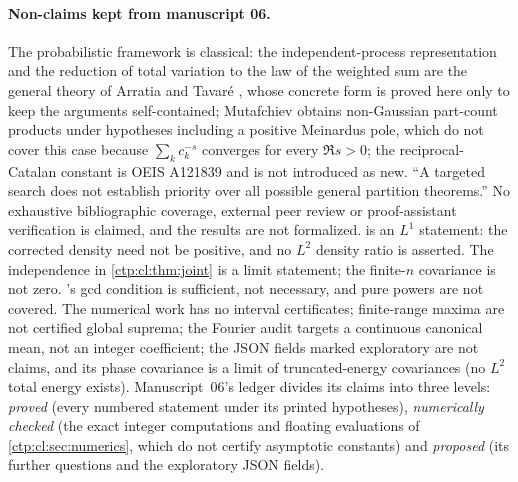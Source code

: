 \documentclass[11pt,a4paper]{article}
\numberwithin{equation}{section}
\theoremstyle{definition}
\theoremstyle{remark}
\begin{document}
\paragraph{Non-claims kept from manuscript 06.} The probabilistic
framework is classical: the independent-process representation and the
reduction of total variation to the law of the weighted sum are the
general theory of Arratia and Tavar\'e \cite[Theorem~3]{arratia}, whose
concrete form is proved here only to keep the arguments self-contained;
Mutafchiev \cite[Theorem~1(i)]{mutafchiev} obtains non-Gaussian
part-count products under hypotheses including a positive Meinardus pole,
which do not cover this case because $\sum_kc_k^{-s}$ converges for every
$\Re s>0$; the reciprocal-Catalan constant is OEIS A121839
\cite{reciprocal} and is not introduced as new. ``A targeted search does
not establish priority over all possible general partition theorems.'' No
exhaustive bibliographic coverage, external peer review or proof-assistant
verification is claimed, and the results are not formalized.
 is an $L^1$ statement: the corrected density need
not be positive, and no $L^2$ density ratio is asserted. The independence
in \cref{ctp:cl:thm:joint} is a limit statement; the finite-$n$ covariance
is not zero. 's gcd condition is sufficient,
not necessary, and pure powers are not covered. The numerical work has no
interval certificates; finite-range maxima are not certified global
suprema; the Fourier audit targets a continuous canonical mean, not an
integer coefficient; the JSON fields marked exploratory are not claims, and
its phase covariance is a limit of truncated-energy covariances (no
$L^2$ total energy exists). Manuscript~06's ledger divides its claims into
three levels: \emph{proved} (every numbered statement under its printed
hypotheses), \emph{numerically checked} (the exact integer computations
and floating evaluations of \cref{ctp:cl:sec:numerics}, which do not
certify asymptotic constants) and \emph{proposed} (its further questions
and the exploratory JSON fields).
\end{document}
